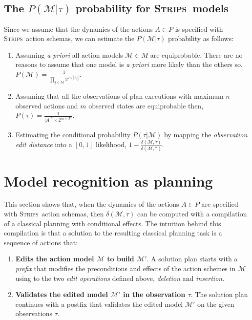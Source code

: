 \documentclass[letterpaper]{article} %
\newcommand{\strips}{\textsc{Strips}}     %
\begin{document}
\subsection{The $P(\mathcal{M}|\tau)$ probability for \strips\ models}
Since we assume that the dynamics of the actions $A\in P$ is specified with \strips\ action schemas, we can estimate the $P(\mathcal{M}|\tau)$ probability as follows:
\begin{enumerate}
\item Assuming {\em a priori} all action models $\mathcal{M}\in M$ are equiprobable. There are no reasons to assume that one model is {\em a priori} more likely than the others so, $P(\mathcal{M})=\frac{1}{\prod_{\xi\in\mathcal{M}} 2^{2\times|F_{\xi}|}}$.
\item Assuming that all the observations of plan executions with maximum $n$ observed actions and $m$ observed states are equiprobable then, $P(\tau)=\frac{1}{|A|^{n}\times2^{m\times|F|}}$.
\item Estimating the conditional probability $P(\tau|\mathcal{M})$ by mapping the {\em observation edit distance} into a $[0,1]$ likelihood, $1-\frac{\delta(\mathcal{M},\tau)}{\delta(\mathcal{M},*)}$.
\end{enumerate}



\section{Model recognition as planning}
This section shows that, when the dynamics of the actions $A\in P$ are specified with \strips\ action schemas, then $\delta(\mathcal{M},\tau)$ can be computed with a compilation of a classical planning with conditional effects. The intuition behind this compilation is that a solution to the resulting classical planning task is a sequence of actions that:
\begin{enumerate}
\item {\bf Edits the action model $\mathcal{M}$ to build $\mathcal{M}'$}. A solution plan starts with a {\em prefix} that modifies the preconditions and effects of the action schemes in $\mathcal{M}$ using to the two {\em edit operations} defined above, {\em deletion} and {\em insertion}. 
\item {\bf Validates the edited model $\mathcal{M}'$ in the observation $\tau$}. The solution plan continues with a postfix that validates the edited model $\mathcal{M}'$ on the given observations $\tau$.
\end{enumerate}
\end{document}
